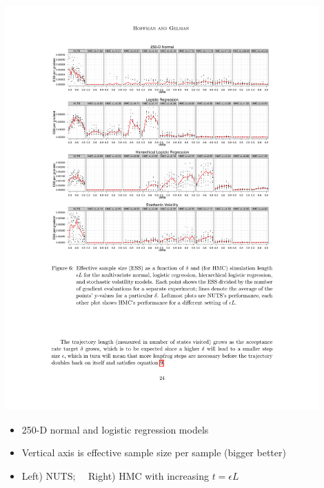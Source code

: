 \documentclass[10pt]{report}
\newcommand{\sld}[1]{\newpage{\noindent\LARGE \ \ \
    \textcolor{MidnightBlue}{\bfseries #1}}\vspace*{4pt}}
\begin{document}
\sld{NUTS vs.\ Basic HMC}

\includegraphics[width=0.9\textwidth]{img/nuts-ess-1.pdf}
{\small
  \begin{itemize}
  \item 250-D normal and logistic regression models
  \item Vertical axis is effective sample size per sample (bigger better)
  \item Left) NUTS; \ \ Right) HMC with increasing $t = \epsilon L$
  \end{itemize}
}

\sld{NUTS vs.\ Basic HMC II}
\end{document}
